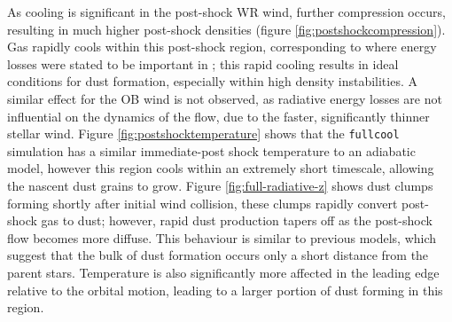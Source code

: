 

As cooling is significant in the post-shock WR wind, further compression occurs, resulting in much higher post-shock densities (figure \ref{fig:postshockcompression}).
Gas rapidly cools within this post-shock region, corresponding to where energy losses were stated to be important in \textcite{usov_stellar_1991}; this rapid cooling results in ideal conditions for dust formation, especially within high density instabilities.
A similar effect for the OB wind is not observed, as radiative energy losses are not influential on the dynamics of the flow, due to the faster, significantly thinner stellar wind.
Figure \ref{fig:postshocktemperature} shows that the \texttt{fullcool} simulation has a similar immediate-post shock temperature to an adiabatic model, however this region cools within an extremely short timescale, allowing the nascent dust grains to grow.
Figure \ref{fig:full-radiative-z} shows dust clumps forming shortly after initial wind collision, these clumps rapidly convert post-shock gas to dust; however, rapid dust production tapers off as the post-shock flow becomes more diffuse.
This behaviour is similar to previous models, which suggest that the bulk of dust formation occurs only a short distance from the parent stars.
Temperature is also significantly more affected in the leading edge relative to the orbital motion, leading to a larger portion of dust forming in this region.

